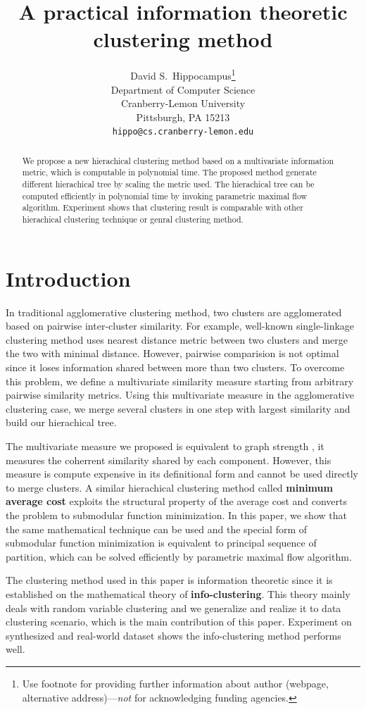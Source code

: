 \documentclass{article}
\title{A practical information theoretic clustering method}
\author{%
  David S.~Hippocampus\thanks{Use footnote for providing further information
    about author (webpage, alternative address)---\emph{not} for acknowledging
    funding agencies.} \\
  Department of Computer Science\\
  Cranberry-Lemon University\\
  Pittsburgh, PA 15213 \\
  \texttt{hippo@cs.cranberry-lemon.edu} \\
}
\begin{document}

\maketitle

\begin{abstract}
  We propose a new hierachical clustering method based on a multivariate information metric, which is computable in polynomial time. The proposed method generate different hierachical tree by scaling the metric used. The hierachical tree can be computed efficiently in polynomial time by invoking parametric maximal flow algorithm. Experiment shows that clustering result is comparable with other hierachical clustering technique or genral clustering method.
\end{abstract}

\section{Introduction}
In traditional agglomerative clustering method, two clusters are agglomerated based on pairwise inter-cluster similarity.  For example, well-known single-linkage clustering method uses nearest distance metric between two clusters and merge the two with minimal distance\cite{RN16}.  However, pairwise comparision is not optimal since it loses information shared between more than two clusters.  To overcome this problem, we define a multivariate similarity measure starting from arbitrary pairwise similarity metrics. Using this multivariate measure in the agglomerative clustering case, we merge several clusters in one step with largest similarity and build our hierachical tree.

The multivariate measure we proposed is equivalent to graph strength \cite{RN12}, it measures the coherrent similarity shared by each component. However, this measure is compute expensive in its definitional form and cannot be used directly to merge clusters. A similar hierachical clustering method called \textbf{minimum average cost} exploits the structural property of the average cost and converts the problem to submodular function minimization\cite{RN7}. In this paper, we show that the same mathematical technique can be used and the special form of submodular function minimization is equivalent to principal sequence of partition\cite{RN3}, which can be solved efficiently by parametric maximal flow algorithm\cite{RN4}. 

The clustering method used in this paper is information theoretic since it is established on the mathematical theory of \textbf{info-clustering}\cite{RN1}. This theory mainly deals with random variable clustering and we generalize and realize it to data clustering scenario, which is the main contribution of this paper. Experiment on synthesized and real-world dataset shows the info-clustering method performs well. 
\end{document}
